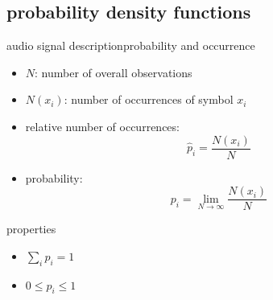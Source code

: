         \subsection{probability density functions}
\begin{frame}{audio signal description}{probability and occurrence}
	\begin{itemize}
		\item[]	$N$: number of overall observations
		\item[] $N(x_i)$: number of occurrences of symbol $x_i$
	\end{itemize}
	
	\pause
	\begin{itemize}
		\item	relative number of occurrences:
				\begin{equation}
					\hat{p}_i = \frac{N(x_i)}{N}
				\end{equation}
		
		\pause
		\item	probability:
				\begin{equation}
					p_i = \lim\limits_{N\rightarrow\infty} \frac{N(x_i)}{N}
				\end{equation}
	\end{itemize}
    \pause
    \begin{block}{properties}
        \begin{itemize}
            \item[]   $\sum\limits_i p_i = 1$
            \item[]   $0 \leq p_i \leq 1$
        \end{itemize}
    \end{block}
\end{frame}

